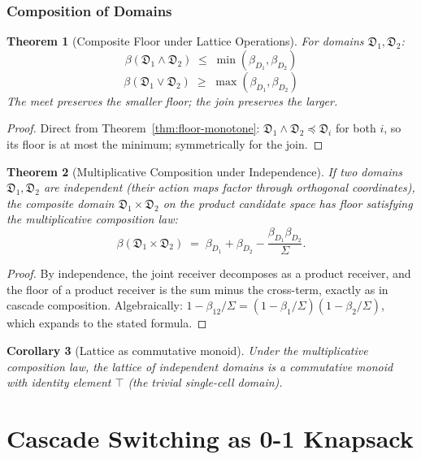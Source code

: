 \documentclass[11pt,a4paper]{article}
\newtheorem{theorem}{Theorem}[section]
\newtheorem{corollary}[theorem]{Corollary}
\newcommand{\Domain}{\mathfrak{D}}
\newcommand{\Sigmax}{\Sigma}
\begin{document}
\section{Composition of Domains}

\begin{theorem}[Composite Floor under Lattice Operations]
\label{thm:composite-floor-lattice}
For domains $\Domain_1, \Domain_2$:
\[
\beta(\Domain_1 \wedge \Domain_2) \;\leq\; \min(\beta_{D_1}, \beta_{D_2})
\]
\[
\beta(\Domain_1 \vee \Domain_2) \;\geq\; \max(\beta_{D_1}, \beta_{D_2})
\]
The meet preserves the smaller floor; the join preserves the larger.
\end{theorem}

\begin{proof}
Direct from Theorem~\ref{thm:floor-monotone}: $\Domain_1 \wedge \Domain_2 \preceq \Domain_i$ for both $i$, so its floor is at most the minimum; symmetrically for the join.
\end{proof}

\begin{theorem}[Multiplicative Composition under Independence]
\label{thm:mult-composition}
If two domains $\Domain_1, \Domain_2$ are independent (their action maps factor through orthogonal coordinates), the composite domain $\Domain_1 \times \Domain_2$ on the product candidate space has floor satisfying the multiplicative composition law:
\[
\beta(\Domain_1 \times \Domain_2) \;=\; \beta_{D_1} + \beta_{D_2} - \frac{\beta_{D_1} \beta_{D_2}}{\Sigmax}.
\]
\end{theorem}

\begin{proof}
By independence, the joint receiver decomposes as a product receiver, and the floor of a product receiver is the sum minus the cross-term, exactly as in cascade composition. Algebraically: $1 - \beta_{12}/\Sigmax = (1 - \beta_1/\Sigmax)(1 - \beta_2/\Sigmax)$, which expands to the stated formula.
\end{proof}

\begin{corollary}[Lattice as commutative monoid]
\label{cor:lattice-monoid}
Under the multiplicative composition law, the lattice of independent domains is a commutative monoid with identity element $\top$ (the trivial single-cell domain).
\end{corollary}

\part{Cascade Switching as 0-1 Knapsack}
\end{document}
